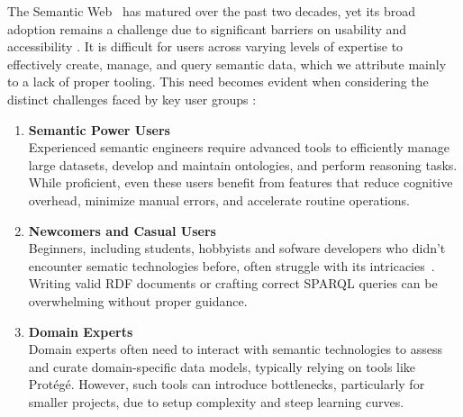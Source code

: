 The Semantic Web~\cite{Berners-Lee_SA_2001} has matured over the past two decades, yet its broad adoption remains a challenge due to significant barriers on usability and accessibility \cite{10.3233/SW-190387}. 
It is difficult for users across varying levels of expertise to effectively create, manage, and query semantic data, which we attribute mainly to a lack of proper tooling.
This need becomes evident when considering the distinct challenges faced by key user groups :

\begin{enumerate}
  \item \textbf{Semantic Power Users}\\
    Experienced semantic engineers require advanced tools to efficiently manage large datasets, develop and maintain ontologies, and perform reasoning tasks.
    While proficient, even these users benefit from features that reduce cognitive overhead, minimize manual errors, and accelerate routine operations.

  \item \textbf{Newcomers and Casual Users}\\
    Beginners, including students, hobbyists and sofware developers who didn't encounter sematic technologies before, often struggle with its intricacies~\cite{EvensteinSigalov2023,Turki2021RepresentingCI}. 
    Writing valid RDF documents or crafting correct SPARQL queries can be overwhelming without proper guidance. 

\item \textbf{Domain Experts}\\
    Domain experts often need to interact with semantic technologies to assess and curate domain-specific data models, typically relying on tools like Protégé. 
    However, such tools can introduce bottlenecks, particularly for smaller projects, due to setup complexity and steep learning curves. 


\end{enumerate}
